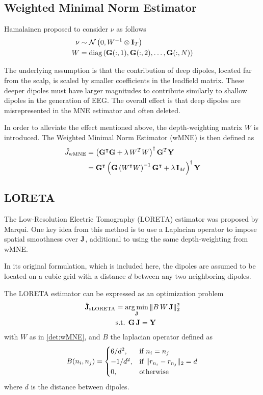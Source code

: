 \subsection{Weighted Minimal Norm Estimator}

Hamalainen proposed to consider $\nu$ as follows
\begin{align}
\nu &\sim
\mathcal{N}\left( 
0, 
W^{-1} \otimes \mathbf{I}_T
 \right)
\\
W &=
\text{diag}\left(   \mathbf{G}(:,1), \mathbf{G}(:,2), \dots, \mathbf{G}(:,N)   \right)
\label{det:wMNE}
\end{align}

The underlying assumption is that the contribution of deep dipoles, located far from the scalp, is scaled by smaller coefficients in the leadfield matrix.
%
These deeper dipoles must have larger magnitudes to contribute similarly to shallow dipoles in the generation of EEG.
%
The overall effect is that deep dipoles are misrepresented in the MNE estimator and often deleted.

In order to alleviate the effect mentioned above, the depth-weighting matrix $W$ is introduced.
%
The Weighted Minimal Norm Estimator (wMNE) is then defined as
\begin{align}
\hat{J}_\text{wMNE} 
&=
\left( \mathbf{G}^\intercal \mathbf{G} + \lambda\, W^T W \right)^\dagger \mathbf{G}^T \mathbf{Y} \\
&=
\mathbf{G}^\intercal
\left( \mathbf{G} \left( W^\intercal W \right)^{-1} \mathbf{G}^\intercal + \lambda\, \mathbf{I}_M \right)^\dagger \mathbf{Y}
\label{est:wMNE}
\end{align}

\subsection{LORETA}

The Low-Resolution Electric Tomography (LORETA) estimator was proposed by Marqui\cite{sloreta}.
%
One key idea from this method is to use a Laplacian operator to impose spatial smoothness over $\mathbf{J}$, additional to using the same depth-weighting from wMNE.

In its original formulation, which is included here, the dipoles are assumed to be located on a cubic grid with a distance $d$ between any two neighboring dipoles. 

The LORETA estimator can be expressed as an optimization problem
\begin{align}
\hat{\mathbf{J}}_\text{sLORETA} 
&=
\operatorname*{arg\,min}_{\mathbf{J}} \,
\lVert  B\, W\, \mathbf{J}  \rVert _2^2 
\nonumber \\
&\text{s.t. }
\mathbf{G}\, \mathbf{J} = \mathbf{Y}
\end{align}
with $W$ as in \eqref{det:wMNE}, and $B$ the laplacian operator defined as
\begin{equation}
B(n_i, n_j) =
\begin{cases}
6/d^2, &\text{if } n_i=n_j \\
-1/d^2, &\text{if } \lVert r_{n_i}-r_{n_j} \rVert_2 = d \\
0, &\text{otherwise}
\end{cases}
\end{equation}
where $d$ is the distance between dipoles.

